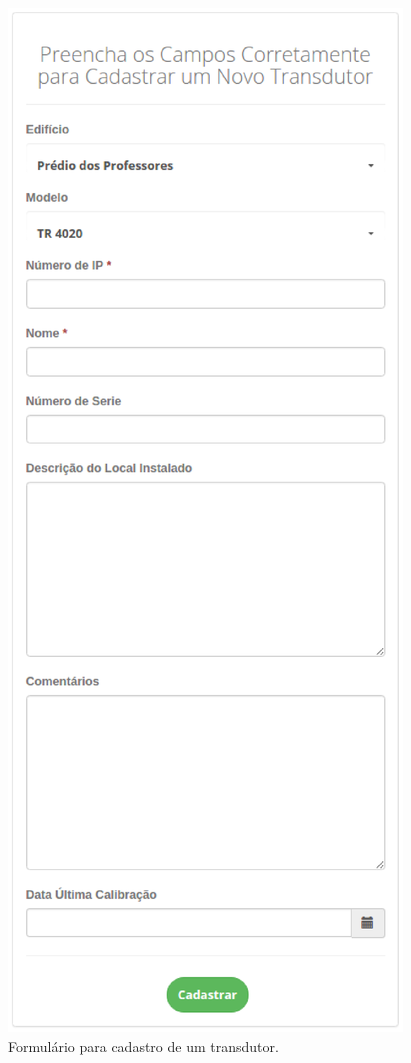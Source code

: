 \begin{apendicesenv}
\begin{figure}[!htpb]
    \centering
    \includegraphics[keepaspectratio=true,scale=0.65]{figuras/img14.eps}
    \caption{Formulário para cadastro de um transdutor.}
    \label{img14}
\end{figure}

\end{apendicesenv}
